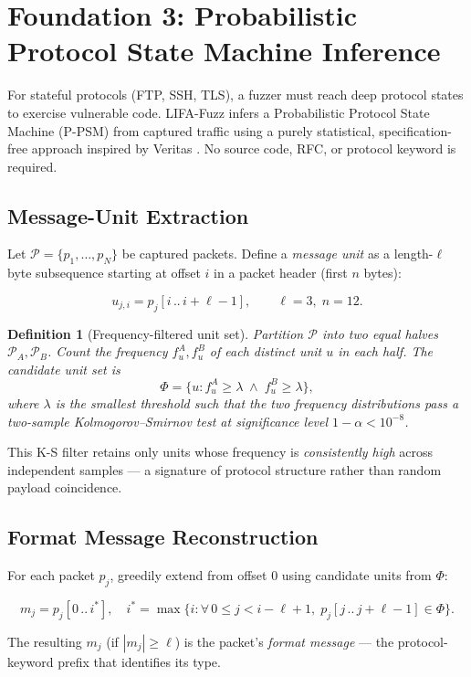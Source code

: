 \documentclass[11pt,a4paper]{article}
\newtheorem{definition}{Definition}
\begin{document}
\section{Foundation 3: Probabilistic Protocol State Machine Inference}

For stateful protocols (FTP, SSH, TLS), a fuzzer must reach deep protocol
states to exercise vulnerable code. LIFA-Fuzz infers a Probabilistic
Protocol State Machine (P-PSM) from captured traffic using a purely
statistical, specification-free approach inspired by Veritas
\cite{veritas}. No source code, RFC, or protocol keyword is required.

\subsection{Message-Unit Extraction}

Let $\mathcal{P} = \{p_1, \dots, p_N\}$ be captured packets. Define a
\emph{message unit} as a length-$\ell$ byte subsequence starting at offset
$i$ in a packet header (first $n$ bytes):

\[
u_{j,i} = p_j[i\,..\,i+\ell-1], \qquad \ell = 3,\; n = 12.
\]

\begin{definition}[Frequency-filtered unit set]
Partition $\mathcal{P}$ into two equal halves $\mathcal{P}_A, \mathcal{P}_B$.
Count the frequency $f_u^A, f_u^B$ of each distinct unit $u$ in each half.
The candidate unit set is
\[
\Phi = \{u : f_u^A \geq \lambda \;\land\; f_u^B \geq \lambda\},
\]
where $\lambda$ is the smallest threshold such that the two frequency
distributions pass a two-sample Kolmogorov--Smirnov test at significance
level $1 - \alpha < 10^{-8}$.
\end{definition}

This K-S filter retains only units whose frequency is \emph{consistently
high} across independent samples --- a signature of protocol structure
rather than random payload coincidence.

\subsection{Format Message Reconstruction}

For each packet $p_j$, greedily extend from offset $0$ using candidate
units from $\Phi$:

\[
m_j = p_j[0\,..\,i^*], \quad i^* = \max\{i : \forall\, 0 \leq j < i-\ell+1,\;
p_j[j\,..\,j+\ell-1] \in \Phi\}.
\]

The resulting $m_j$ (if $|m_j| \geq \ell$) is the packet's \emph{format
message} --- the protocol-keyword prefix that identifies its type.
\end{document}
